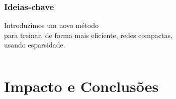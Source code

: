 \documentclass[xetex,aspectratio=169,xcolor,professionalfonts,hyperref]{beamer}
\begin{document}
\begin{frame}
    \frametitle{Ideias-chave}

    \centering\fontsize{14pt}{14}\selectfont%
    Introduzimos um novo método\\
    para treinar, de forma mais eficiente, redes {\color{myDarkYellow} compactas},\\
    usando {\color{tPeony} esparsidade}.
    \vfill
    \begin{columns}[T]
        \small
        \begin{column}{.45\textwidth}
            \centering
            \vspace{-1em}
        \end{column}
        \begin{column}{.45\textwidth}
            \centering
        \end{column}
    \end{columns}
\end{frame}

\section{Impacto e Conclusões}
\end{document}
